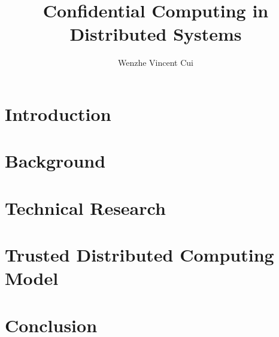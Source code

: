 \documentclass[oneside, english, final]{sdqthesis}
\author{Wenzhe Vincent Cui}
\title{Confidential Computing in Distributed Systems}
\begin{document}
\setpdf

\maketitle

\frontmatter



\setcounter{page}{1}


\listoftodos
 



\tableofcontents

\listoffigures
\listoftables


\mainmatter

\chapter{Introduction}


\chapter{Background}


\chapter{Technical Research}
\label{ch:technical-research}




\chapter{Trusted Distributed Computing Model}
\label{ch:trusted-distributed-computing-model}


\chapter{Conclusion}



\nocite{*}
\printbibliography[heading=bibintoc]

%
\end{document}
